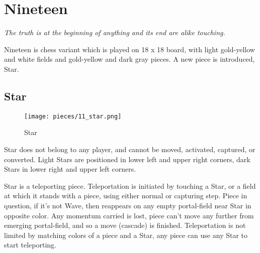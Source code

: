 

\chapter*{Nineteen}
\label{ch:Nineteen}

\begin{flushright}
\parbox{0.8\textwidth}{
\emph{The truth is at the beginning of anything and its end are alike touching. \newline
{} } }
\end{flushright}

\noindent
Nineteen is chess variant which is played on 18 x 18 board, with light
gold-yellow and white fields and gold-yellow and dark gray pieces.
A new piece is introduced, Star.

\clearpage %

\section*{Star}
\label{sec:Nineteen/Star}

\vspace*{-1.0\baselineskip}
\noindent
\begin{wrapfigure}[11]{l}{0.4\textwidth}
\centering
\texttt{[image: pieces/11\_star.png]}
\caption{Star}
\label{fig:11_star}
\end{wrapfigure}
Star does not belong to any player, and cannot be moved, activated, captured, or
converted. Light Stars are positioned in lower left and upper right corners, dark
Stars in lower right and upper left corners.

Star is a teleporting piece. Teleportation is initiated by touching a Star, or a
field at which it stands with a piece, using either normal or capturing step. Piece
in question, if it's not Wave, then reappears on any empty portal-field near Star
in opposite color. Any momentum carried is lost, piece can't move any further from
emerging portal-field, and so a move (cascade) is finished. Teleportation is not
limited by matching colors of a piece and a Star, any piece can use any Star to
start teleporting.

